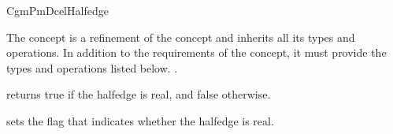 \ccRefPageBegin

\begin{ccRefConcept}{CgmPmDcelHalfedge}

The \ccRefName concept is a refinement of the 
concept and inherits all its types and operations. In addition to the
requirements of the  concept, it must provide the
types and operations listed below. . 

\ccOperations
  {returns true if the halfedge is real, and false otherwise.}

\ccOperations
  {sets the flag that indicates whether the halfedge is real.}

\end{ccRefConcept}
\ccRefPageEnd
